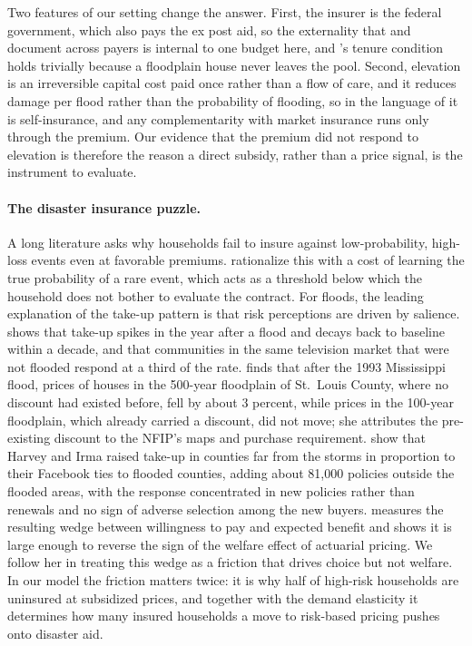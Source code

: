 Two features of our setting change the answer. First, the insurer is the federal government, which also pays the ex post aid, so the externality that \citet{chandragrubermcknight2010} and \citet{starctown2018} document across payers is internal to one budget here, and \citeauthor{newhouse2006}'s tenure condition holds trivially because a floodplain house never leaves the pool. Second, elevation is an irreversible capital cost paid once rather than a flow of care, and it reduces damage per flood rather than the probability of flooding, so in the language of \citet{ehrlichbecker1972} it is self-insurance, and any complementarity with market insurance runs only through the premium. Our evidence that the premium did not respond to elevation is therefore the reason a direct subsidy, rather than a price signal, is the instrument to evaluate.

\paragraph{The disaster insurance puzzle.}
A long literature asks why households fail to insure against low-probability, high-loss events even at favorable premiums. \citet{kunreutherpauly2004} rationalize this with a cost of learning the true probability of a rare event, which acts as a threshold below which the household does not bother to evaluate the contract. For floods, the leading explanation of the take-up pattern is that risk perceptions are driven by salience. \citet{gallagher2014} shows that take-up spikes in the year after a flood and decays back to baseline within a decade, and that communities in the same television market that were not flooded respond at a third of the rate. \citet{kousky2010} finds that after the 1993 Mississippi flood, prices of houses in the 500-year floodplain of St.\ Louis County, where no discount had existed before, fell by about 3 percent, while prices in the 100-year floodplain, which already carried a discount, did not move; she attributes the pre-existing discount to the NFIP's maps and purchase requirement. \citet{xuboxcouillard2024} show that Harvey and Irma raised take-up in counties far from the storms in proportion to their Facebook ties to flooded counties, adding about 81,000 policies outside the flooded areas, with the response concentrated in new policies rather than renewals and no sign of adverse selection among the new buyers. \citet{wagner2022} measures the resulting wedge between willingness to pay and expected benefit and shows it is large enough to reverse the sign of the welfare effect of actuarial pricing. We follow her in treating this wedge as a friction that drives choice but not welfare. In our model the friction matters twice: it is why half of high-risk households are uninsured at subsidized prices, and together with the demand elasticity it determines how many insured households a move to risk-based pricing pushes onto disaster aid.

